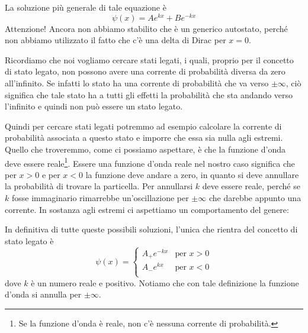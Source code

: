 \begin{soluzione}
   La soluzione più generale di tale equazione è
   \begin{equation*}
      \psi(x)=Ae^{kx} + Be^{-kx}
   \end{equation*}
   Attenzione! Ancora non abbiamo stabilito che è un generico autostato, perché non abbiamo utilizzato il fatto che c'è una delta di Dirac per $x=0$.
   
   Ricordiamo che noi vogliamo cercare stati legati, i quali, proprio per il concetto di stato legato, non possono avere una corrente di probabilità diversa da zero all'infinito. Se infatti lo stato ha una corrente di probabilità che va verso $\pm \infty$, ciò significa che tale stato ha a tutti gli effetti la probabilità che sta andando verso l'infinito e quindi non può essere un stato legato.
   
   Quindi per cercare stati legati potremmo ad esempio calcolare la corrente di probabilità associata a questo stato e imporre che essa sia nulla agli estremi. Quello che troveremmo, come ci possiamo aspettare, è che la funzione d'onda deve essere reale\footnote{Se la funzione d'onda è reale, non c'è nessuna corrente di probabilità.}. Essere una funzione d'onda reale nel nostro caso significa che per $x>0$ e per $x<0$ la funzione deve andare a zero, in quanto si deve annullare la probabilità di trovare la particella. Per annullarsi $k$ deve essere reale, perché se $k$ fosse immaginario rimarrebbe un'oscillazione per $\pm\infty$ che darebbe appunto una corrente. In sostanza agli estremi ci aspettiamo un comportamento del genere:

   \begin{figure}[H]
      \centering
   \end{figure}

   In definitiva di tutte queste possibili soluzioni, l'unica che rientra del concetto di stato legato è
   \begin{equation*}
      \psi(x)=
      \begin{cases}
         A_{+}e^{-kx} & \text{per } x>0\\
         A_{-}e^{kx} & \text{per } x<0\\
      \end{cases}
   \end{equation*}
   dove $k$ è un numero reale e positivo. Notiamo che con tale definizione la funzione d'onda si annulla per $\pm \infty$.
   

\end{soluzione}
